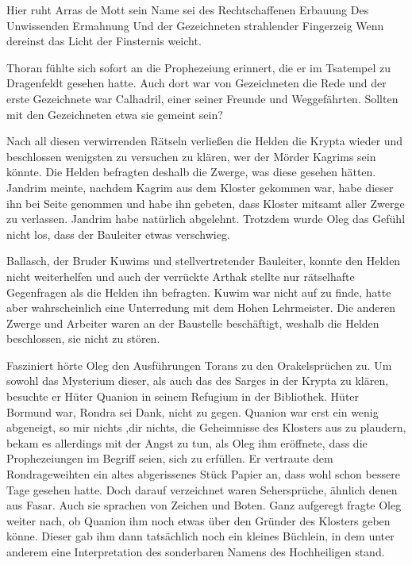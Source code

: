 Hier ruht Arras de Mott\newline
sein Name sei des Rechtschaffenen Erbauung\newline
Des Unwissenden Ermahnung\newline
Und der Gezeichneten strahlender Fingerzeig\newline
Wenn dereinst\newline
das Licht der Finsternis weicht.\par
Thoran fühlte sich sofort an die Prophezeiung erinnert, die er im Tsatempel zu Dragenfeldt gesehen hatte. Auch dort war von Gezeichneten die Rede und der erste Gezeichnete war Calhadril, einer seiner Freunde und Weggefährten. Sollten mit den Gezeichneten etwa sie gemeint sein?\par
Nach all diesen verwirrenden Rätseln verließen die Helden die Krypta wieder und beschlossen wenigsten zu versuchen zu klären, wer der Mörder Kagrims sein könnte. Die Helden befragten deshalb die Zwerge, was diese gesehen hätten. Jandrim meinte, nachdem Kagrim aus dem Kloster gekommen war, habe dieser ihn bei Seite genommen und habe ihn gebeten, dass Kloster mitsamt aller Zwerge zu verlassen. Jandrim habe natürlich abgelehnt. Trotzdem wurde Oleg das Gefühl nicht los, dass der Bauleiter etwas verschwieg.\par
Ballasch, der Bruder Kuwims und stellvertretender Bauleiter, konnte den Helden nicht weiterhelfen und auch der verrückte Arthak stellte nur rätselhafte Gegenfragen als die Helden ihn befragten. Kuwim war nicht auf zu finde, hatte aber wahrscheinlich eine Unterredung mit dem Hohen Lehrmeister. Die anderen Zwerge und Arbeiter waren an der Baustelle beschäftigt, weshalb die Helden beschlossen, sie nicht zu stören.\par
Fasziniert hörte Oleg den Ausführungen Torans zu den Orakelsprüchen zu. Um sowohl das Mysterium dieser, als auch das des Sarges in der Krypta zu klären, besuchte er Hüter Quanion in seinem Refugium in der Bibliothek. Hüter Bormund war, Rondra sei Dank, nicht zu gegen. Quanion war erst ein wenig abgeneigt, so mir nichts ,dir nichts, die Geheimnisse des Klosters aus zu plaudern, bekam es allerdings mit der Angst zu tun, als Oleg ihm eröffnete, dass die Prophezeiungen im Begriff seien, sich zu erfüllen. Er vertraute dem Rondrageweihten ein altes abgerissenes Stück Papier an, dass wohl schon bessere Tage gesehen hatte. Doch darauf verzeichnet waren Sehersprüche, ähnlich denen aus Fasar. Auch sie sprachen von Zeichen und Boten. Ganz aufgeregt fragte Oleg weiter nach, ob Quanion ihm noch etwas über den Gründer des Klosters geben könne. Dieser gab ihm dann tatsächlich noch ein kleines Büchlein, in dem unter anderem eine Interpretation des sonderbaren Namens des Hochheiligen stand. \par

